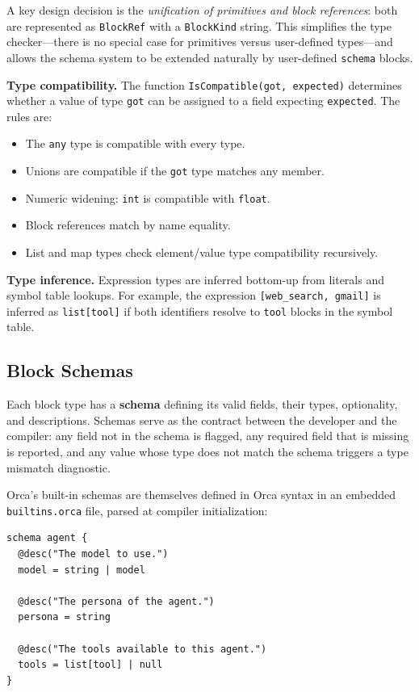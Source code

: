 \documentclass[sigconf,nonacm]{acmart}
\begin{document}
A key design decision is the \emph{unification of primitives and block
references}: both are represented as \texttt{BlockRef} with a
\texttt{BlockKind} string. This simplifies the type checker---there is
no special case for primitives versus user-defined types---and allows
the schema system to be extended naturally by user-defined \texttt{schema}
blocks.

\noindent\textbf{Type compatibility.} The function
\texttt{IsCompatible(got, expected)} determines whether a value of type
\texttt{got} can be assigned to a field expecting \texttt{expected}. The
rules are:
\begin{itemize}[leftmargin=*]
  \item The \texttt{any} type is compatible with every type.
  \item Unions are compatible if the \texttt{got} type matches any member.
  \item Numeric widening: \texttt{int} is compatible with \texttt{float}.
  \item Block references match by name equality.
  \item List and map types check element/value type compatibility recursively.
\end{itemize}

\noindent\textbf{Type inference.} Expression types are inferred
bottom-up from literals and symbol table lookups. For example, the
expression \texttt{[web\_search, gmail]} is inferred as
\texttt{list[tool]} if both identifiers resolve to \texttt{tool} blocks
in the symbol table.

\subsection{Block Schemas}
\label{sec:language:schemas}

Each block type has a \textbf{schema} defining its valid fields, their
types, optionality, and descriptions. Schemas serve as the contract between
the developer and the compiler: any field not in the schema is flagged,
any required field that is missing is reported, and any value whose type
does not match the schema triggers a type mismatch diagnostic.

Orca's built-in schemas are themselves defined in Orca syntax in an
embedded \texttt{builtins.orca} file, parsed at compiler initialization:

\begin{lstlisting}
schema agent {
  @desc("The model to use.")
  model = string | model

  @desc("The persona of the agent.")
  persona = string

  @desc("The tools available to this agent.")
  tools = list[tool] | null
}
\end{lstlisting}
\end{document}
